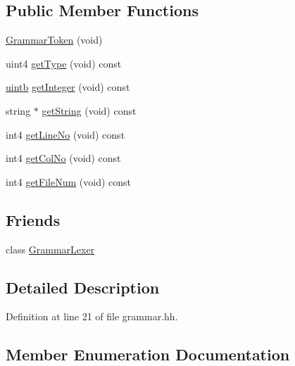\subsection*{Public Member Functions}
\begin{DoxyCompactItemize}
\item 
\mbox{\hyperlink{class_grammar_token_ac0112a55613acaf2a3960944b1d13f91}{Grammar\+Token}} (void)
\item 
uint4 \mbox{\hyperlink{class_grammar_token_a79430edcb770d6cfe7e5b5b879e34feb}{get\+Type}} (void) const
\item 
\mbox{\hyperlink{types_8h_a2db313c5d32a12b01d26ac9b3bca178f}{uintb}} \mbox{\hyperlink{class_grammar_token_a69d5c6bd5a21ce2d08a3c7152cf1042f}{get\+Integer}} (void) const
\item 
string $\ast$ \mbox{\hyperlink{class_grammar_token_a977abb111592f4f323826e9ded98b125}{get\+String}} (void) const
\item 
int4 \mbox{\hyperlink{class_grammar_token_adf9f3d1a7dec07c74cd17bf47b3860fa}{get\+Line\+No}} (void) const
\item 
int4 \mbox{\hyperlink{class_grammar_token_a44af9bd3befd865332ea8361a14a559e}{get\+Col\+No}} (void) const
\item 
int4 \mbox{\hyperlink{class_grammar_token_abb2087b33e420d4cdbd10478b58a7021}{get\+File\+Num}} (void) const
\end{DoxyCompactItemize}
\subsection*{Friends}
\begin{DoxyCompactItemize}
\item 
class \mbox{\hyperlink{class_grammar_token_a3c6f83bd2b0fb98fea9b533d020c0af4}{Grammar\+Lexer}}
\end{DoxyCompactItemize}


\subsection{Detailed Description}


Definition at line 21 of file grammar.\+hh.



\subsection{Member Enumeration Documentation}
\mbox{\label{class_grammar_token_af57ea2c6c00ba3259259427a36c2c3ee}} 
